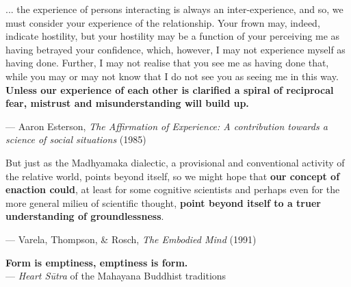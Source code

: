 \documentclass{article}
\begin{document}
\vspace{20px}

\begin{center}
    ... the experience of persons interacting is always an inter-experience, and so, we must consider your experience of the relationship. Your frown may, indeed, indicate hostility, but your hostility may be a function of your perceiving me as having betrayed your confidence, which, however, I may not experience myself as having done. Further, I may not realise that you see me as having done that, while you may or may not know that I do not see you as seeing me in this way. \textbf{Unless our experience of each other is clarified a spiral of reciprocal fear, mistrust and misunderstanding will build up.}

    \vspace{0.25cm}
    — Aaron Esterson, \emph{The Affirmation of Experience: A contribution towards a science of social situations} (1985) \cite{esterson1985}
\end{center}

\vspace{20px}


\begin{center}
    But just as the Madhyamaka dialectic, a provisional and conventional activity of the relative world, points beyond itself, so we might hope that \textbf{our concept of enaction could}, at least for some cognitive scientists and perhaps even for the more general milieu of scientific thought, \textbf{point beyond itself to a truer understanding of groundlessness}.

    \vspace{0.5cm}
    — Varela, Thompson, \& Rosch, \emph{The Embodied Mind} (1991) \cite{varela1991}
\end{center}

\vspace{20px} %

\begin{center}
    \textbf{Form is emptiness, emptiness is form.}\\

    \vspace{0.5cm}
    — \emph{Heart Sūtra} of the Mahayana Buddhist traditions
\end{center}

\newpage




\tableofcontents
\end{document}
